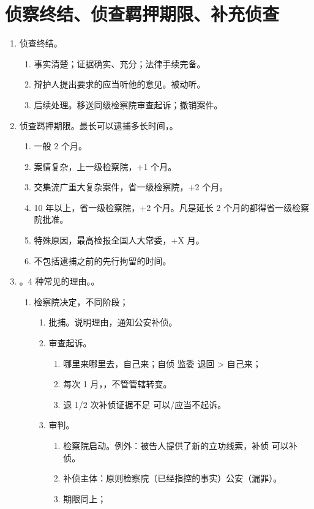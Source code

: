 \section{侦察终结、侦查羁押期限、补充侦查}
\begin{enumerate}
  \item 侦查终结。
        \begin{enumerate}
          \item 事实清楚；证据确实、充分；法律手续完备。
          \item 辩护人提出要求的应当听他的意见。被动听。
          \item 后续处理。移送同级检察院审查起诉；撤销案件。
        \end{enumerate}
  \item 侦查羁押期限。最长可以逮捕多长时间，。
        \begin{enumerate}
          \item 一般 2 个月。
          \item 案情复杂，上一级检察院，+1 个月。
          \item 交集流广重大复杂案件，省一级检察院，+2 个月。
          \item 10 年以上，省一级检察院，+2 个月。凡是延长 2 个月的都得省一级检察院批准。
          \item 特殊原因，最高检报全国人大常委，+X 月。
          \item 不包括逮捕之前的先行拘留的时间。
        \end{enumerate}
  \item {}。4 种常见的理由。。
        \begin{enumerate}
          \item 检察院决定，不同阶段；
                \begin{enumerate}
                  \item 批捕。说明理由，通知公安补侦。
                  \item 审查起诉。
                        \begin{enumerate}
                          \item 哪里来哪里去，自己来；自侦 \hz 监委 退回 > 自己来；
                          \item 每次 1 月，，不管管辖转变。
                          \item 退 1/2 次补侦证据不足 \yjt 可以/应当不起诉。
                        \end{enumerate}
                  \item 审判。
                        \begin{enumerate}
                          \item 检察院启动。例外：被告人提供了新的立功线索，补侦 \bdy 可以补侦。
                          \item 补侦主体：原则检察院（已经指控的事实）\hz 公安（漏罪）。
                          \item 期限同上；
                        \end{enumerate}
                \end{enumerate}
        \end{enumerate}
\end{enumerate}
